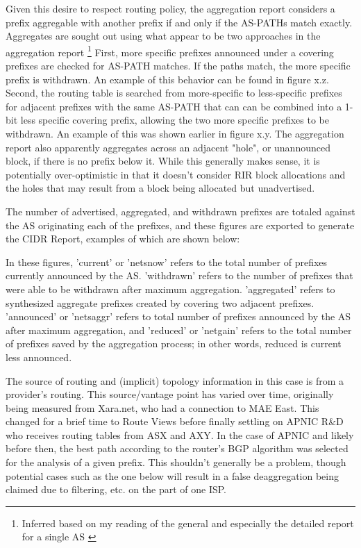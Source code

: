 Given this desire to respect routing policy, the aggregation report considers a prefix aggregable with another prefix if and only if the AS-PATHs match exactly. Aggregates are sought out using what appear to be two approaches in the aggregation report \footnote{Inferred based on my reading of the general and especially the detailed report for a single AS \cite{cidr-report-details}} First, more specific prefixes announced under a covering prefixes are checked for AS-PATH matches. If the paths match, the more specific prefix is withdrawn. An example of this behavior can be found in figure x.z. Second, the routing table is searched from more-specific to less-specific prefixes for adjacent prefixes with the same AS-PATH that can can be combined into a 1-bit less specific covering prefix, allowing the two more specific prefixes to be withdrawn. An example of this was shown earlier in figure x.y. The aggregation report also apparently aggregates across an adjacent "hole", or unannounced block, if there is no prefix below it. While this generally makes sense, it is potentially over-optimistic in that it doesn't consider RIR block allocations and the holes that may result from a block being allocated but unadvertised.

The number of advertised, aggregated, and withdrawn prefixes are totaled against the AS originating each of the prefixes, and these figures are exported to generate the CIDR Report, examples of which are shown below:


In these figures, 'current' or 'netsnow' refers to the total number of prefixes currently announced by the AS. 'withdrawn' refers to the number of prefixes that were able to be withdrawn after maximum aggregation. 'aggregated' refers to synthesized aggregate prefixes created by covering two adjacent prefixes. 'announced' or 'netsaggr' refers to total number of prefixes announced by the AS after maximum aggregation, and 'reduced' or 'netgain' refers to the total number of prefixes saved by the aggregation process; in other words, reduced is current less announced.


The source of routing and (implicit) topology information in this case is from a provider's routing. This source/vantage point has varied over time, originally being measured from Xara.net, who had a connection to MAE East. This changed for a brief time to Route Views before finally settling on APNIC R\&D who receives routing tables from ASX and AXY. In the case of APNIC and likely before then, the best path according to the router's BGP algorithm was selected for the analysis of a given prefix. This shouldn't generally be a problem, though potential cases such as the one below will result in a false deaggregation being claimed due to filtering, etc. on the part of one ISP.


